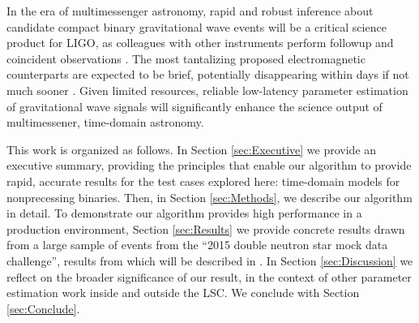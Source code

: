 In the era of multimessenger astronomy, rapid and robust inference about candidate compact binary gravitational wave
events will be a critical science product for LIGO, as  colleagues with other instruments  perform followup and
coincident observations \cite{LIGO-2013-WhitePaper-CoordinatedEMObserving}.  
%
The most tantalizing proposed electromagnetic counterparts are expected to be brief, potentially disappearing within
days if not much
sooner \cite{2012ApJ...746...48M,2014MNRAS.439..757G,2014MNRAS.437L...6K,2014MNRAS.437.1821M,2014ApJ...780...31T,2013ApJ...775...18B}.  
%
Given limited resources, reliable low-latency parameter estimation of gravitational wave signals will significantly enhance the science output of
multimessener, time-domain astronomy.  

% 


This work is organized as follows.
In Section \ref{sec:Executive} we provide an executive summary, providing the principles that enable our algorithm to
provide rapid, accurate results for the test cases explored here:  time-domain models for nonprecessing binaries.  
%
Then, in Section \ref{sec:Methods}, we describe our algorithm in detail.  
%
To demonstrate  our algorithm provides high performance in a production environment,  Section \ref{sec:Results} we
provide concrete results drawn from a large sample of events from the ``2015 double neutron star mock data challenge'',
results from which will be described in \cite{first2years}.  
%
In Section \ref{sec:Discussion} we reflect on the broader significance of our result, in the context of other parameter
estimation work inside and outside the LSC.  
%
We conclude with Section \ref{sec:Conclude}.  
